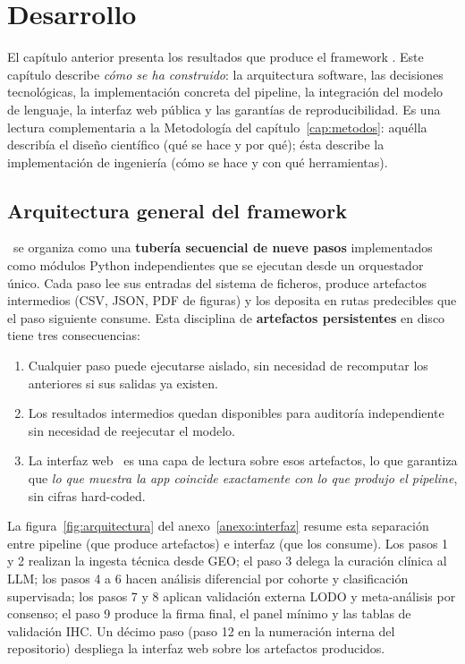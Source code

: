 \chapter{Desarrollo}
\label{cap:desarrollo}

El capítulo anterior presenta los resultados que produce el framework
\framework. Este capítulo describe \emph{cómo se ha construido}: la
arquitectura software, las decisiones tecnológicas, la implementación
concreta del pipeline, la integración del modelo de lenguaje, la
interfaz web pública y las garantías de reproducibilidad. Es una lectura
complementaria a la Metodología del capítulo~\ref{cap:metodos}: aquélla
describía el diseño científico (qué se hace y por qué); ésta describe la
implementación de ingeniería (cómo se hace y con qué herramientas).

\section{Arquitectura general del framework}
\label{sec:dev_arquitectura}

\framework\ se organiza como una \textbf{tubería secuencial de nueve
pasos} implementados como módulos Python independientes que se ejecutan
desde un orquestador único. Cada paso lee sus entradas del sistema de
ficheros, produce artefactos intermedios (CSV, JSON, PDF de figuras) y
los deposita en rutas predecibles que el paso siguiente consume. Esta
disciplina de \textbf{artefactos persistentes} en disco tiene tres
consecuencias:

\begin{enumerate}
  \item Cualquier paso puede ejecutarse aislado, sin necesidad de
  recomputar los anteriores si sus salidas ya existen.
  \item Los resultados intermedios quedan disponibles para auditoría
  independiente sin necesidad de reejecutar el modelo.
  \item La interfaz web \framework\ es una capa de lectura sobre esos
  artefactos, lo que garantiza que \emph{lo que muestra la app coincide
  exactamente con lo que produjo el pipeline}, sin cifras hard-coded.
\end{enumerate}

La figura~\ref{fig:arquitectura} del anexo~\ref{anexo:interfaz} resume
esta separación entre pipeline (que produce artefactos) e interfaz (que
los consume).
Los pasos 1 y 2 realizan la ingesta técnica desde GEO; el paso 3 delega
la curación clínica al LLM; los pasos 4 a 6 hacen análisis diferencial
por cohorte y clasificación supervisada; los pasos 7 y 8 aplican
validación externa LODO y meta-análisis por consenso; el paso 9 produce
la firma final, el panel mínimo y las tablas de validación IHC. Un
décimo paso (paso 12 en la numeración interna del repositorio) despliega
la interfaz web sobre los artefactos producidos.

